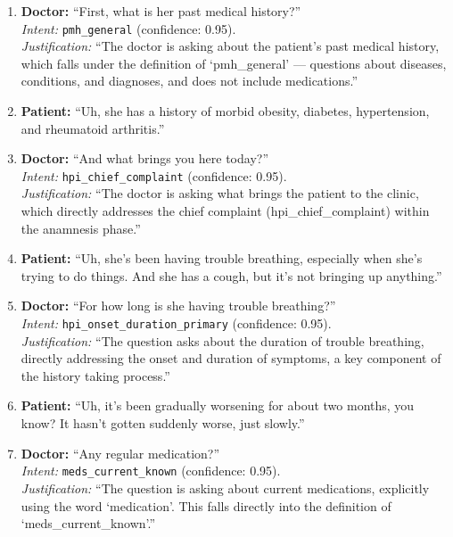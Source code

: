 \begin{enumerate}
  \item \textbf{Doctor:} ``First, what is her past medical history?'' \\
  \emph{Intent:} \texttt{pmh\_general} (confidence: 0.95). \\
  \emph{Justification:} ``The doctor is asking about the patient's past medical history, which falls under the definition of `pmh\_general' --- questions about diseases, conditions, and diagnoses, and does not include medications.''

  \item \textbf{Patient:} ``Uh, she has a history of morbid obesity, diabetes, hypertension, and rheumatoid arthritis.''

  \item \textbf{Doctor:} ``And what brings you here today?'' \\
  \emph{Intent:} \texttt{hpi\_chief\_complaint} (confidence: 0.95). \\
  \emph{Justification:} ``The doctor is asking what brings the patient to the clinic, which directly addresses the chief complaint (hpi\_chief\_complaint) within the anamnesis phase.''

  \item \textbf{Patient:} ``Uh, she's been having trouble breathing, especially when she's trying to do things. And she has a cough, but it's not bringing up anything.''

  \item \textbf{Doctor:} ``For how long is she having trouble breathing?'' \\
  \emph{Intent:} \texttt{hpi\_onset\_duration\_primary} (confidence: 0.95). \\
  \emph{Justification:} ``The question asks about the duration of trouble breathing, directly addressing the onset and duration of symptoms, a key component of the history taking process.''

  \item \textbf{Patient:} ``Uh, it's been gradually worsening for about two months, you know? It hasn't gotten suddenly worse, just slowly.''

  \item \textbf{Doctor:} ``Any regular medication?'' \\
  \emph{Intent:} \texttt{meds\_current\_known} (confidence: 0.95). \\
  \emph{Justification:} ``The question is asking about current medications, explicitly using the word `medication'. This falls directly into the definition of `meds\_current\_known'.''


\end{enumerate}
